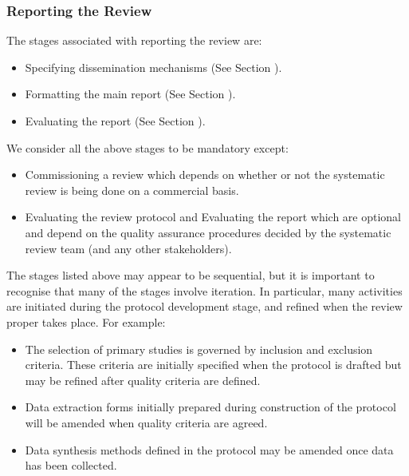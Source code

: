 \subsubsection{Reporting the Review}
The stages associated with reporting the review are:
\begin{itemize}
	\item Specifying dissemination mechanisms (See Section ).
	\item Formatting the main report (See Section ).
	\item Evaluating the report (See Section ).
\end{itemize}

We consider all the above stages to be mandatory except:
\begin{itemize}
	\item Commissioning a review which depends on whether or not the systematic review is being done on a
	      commercial basis.
	\item Evaluating the review protocol and Evaluating the report which are optional and depend on the
	      quality assurance procedures decided by the systematic review team (and any other stakeholders).
\end{itemize}

The stages listed above may appear to be sequential, but it is important to recognise that many of
the stages involve iteration. In particular, many activities are initiated during the protocol
development stage, and refined when the review proper takes place. For example:
\begin{itemize}
	\item The selection of primary studies is governed by inclusion and exclusion criteria. These criteria
	      are initially specified when the protocol is drafted but may be refined after quality criteria are
	      defined.
	\item Data extraction forms initially prepared during construction of the protocol will be amended when
	      quality criteria are agreed.
	\item Data synthesis methods defined in the protocol may be amended once data has been collected.
\end{itemize}
